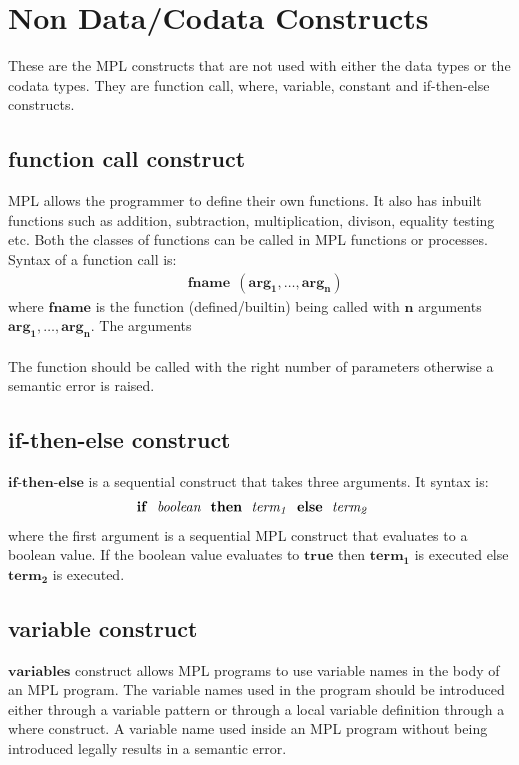 \documentclass[11pt]{article}
\begin{document}
\section {Non Data/Codata Constructs}\label{SeqMPL:IndCons}
These are the MPL constructs that are not used with either the data types or the codata types. They are {\sf function call}, {\sf where}, {\sf variable}, {\sf constant} and {\sf if-then-else} constructs.
\subsection {function call construct}
MPL allows the programmer to define their own functions. It also has inbuilt functions such as addition, subtraction, multiplication, divison, equality testing etc. Both the classes of functions can be called in MPL functions or processes. Syntax of a function call is:
\begin{align*} 
&\mathbf{fname~~(arg_1,\ldots,arg_n)}
\end{align*}
where $\mathbf{fname}$ is the function (defined/builtin) being called with $\mathbf{n}$ arguments $\mathbf{arg_1,\ldots,arg_n}$. The arguments
~~\\~~\\
The function should be called with the right number of parameters otherwise a semantic error is raised. 
\subsection {if-then-else construct}
$\mathbf{if\texttt{-} then\texttt{-}else}$ is a sequential construct that takes three arguments. It syntax is:
\begin{align*} 
&\mathbf{if~~{\it boolean} ~~then~~ {\it term_1}~~ else~~ {\it term_2}}
\end{align*}
where the first argument is a sequential MPL construct that evaluates to a boolean value. If the boolean value evaluates to $\mathbf{true}$ then $\mathbf{term_1}$ is executed else $\mathbf{term_2}$ is executed.
\subsection {variable construct}
$\mathbf{variables}$ construct allows MPL programs to use variable names in the body of an MPL program. The variable names used in the program should be introduced either through a variable pattern or through a local variable definition through a where construct. A variable name used inside an MPL program without being introduced legally results in a semantic error.
\end{document}
